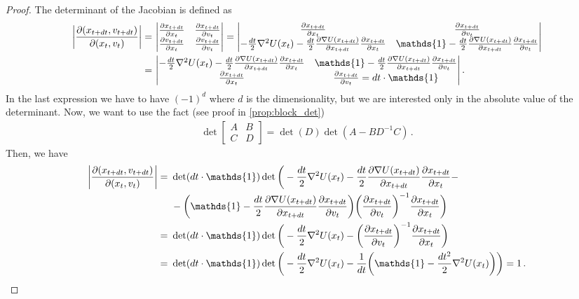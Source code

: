 \begin{proof}
The determinant of the Jacobian is defined as
    \begin{align}
        \bigg|\deriv{(x_{t+dt}, v_{t+dt})}{(x_{t}, v_{t})}\bigg| =~& 
        \begin{vmatrix}
            \deriv{x_{t+dt}}{x_{t}} & \deriv{x_{t+dt}}{v_{t}} \\
            \deriv{v_{t+dt}}{x_{t}} & \deriv{v_{t+dt}}{v_{t}} 
        \end{vmatrix}
        = \begin{vmatrix}
            \deriv{x_{t+dt}}{x_{t}} & \deriv{x_{t+dt}}{v_{t}} \\
            - \frac{dt}{2}\nabla^2U(x_t) - \frac{dt}{2}\deriv{\nabla U(x_{t+dt})}{x_{t+dt}}\deriv{x_{t+dt}}{x_t} & \mathds{1} - \frac{dt}{2}\deriv{\nabla U(x_{t+dt})}{x_{t+dt}}\deriv{x_{t+dt}}{v_t}
        \end{vmatrix}\\
        =~&
        \begin{vmatrix}
            - \frac{dt}{2}\nabla^2U(x_t) - \frac{dt}{2}\deriv{\nabla U(x_{t+dt})}{x_{t+dt}}\deriv{x_{t+dt}}{x_t} & \mathds{1} - \frac{dt}{2}\deriv{\nabla U(x_{t+dt})}{x_{t+dt}}\deriv{x_{t+dt}}{v_t}\\
            \deriv{x_{t+dt}}{x_{t}} & \deriv{x_{t+dt}}{v_{t}} = dt\cdot \mathds{1}
        \end{vmatrix}\,.
    \end{align}
In the last expression we have to have $(-1)^d$ where $d$ is the dimensionality, but we are interested only in the absolute value of the determinant. Now, we want to use the fact (see proof in \cref{prop:block_det})
    \begin{align}
        \det
        \begin{bmatrix}
            A & B\\
            C & D
        \end{bmatrix}
        = \det(D)\det(A-BD^{-1}C)\,.
    \end{align}
Then, we have
    \begin{align}
        \bigg|\deriv{(x_{t+dt}, v_{t+dt})}{(x_{t}, v_{t})}\bigg| =~& 
        \det(dt\cdot \mathds{1})\det\bigg(- \frac{dt}{2}\nabla^2U(x_t) - \frac{dt}{2}\deriv{\nabla U(x_{t+dt})}{x_{t+dt}}\deriv{x_{t+dt}}{x_t} - \\
        ~&-\left(\mathds{1} - \frac{dt}{2}\deriv{\nabla U(x_{t+dt})}{x_{t+dt}}\deriv{x_{t+dt}}{v_t}\right)\left(\deriv{x_{t+dt}}{v_{t}}\right)^{-1}\deriv{x_{t+dt}}{x_{t}}\bigg)\\
        =~& \det(dt\cdot \mathds{1})\det\bigg(- \frac{dt}{2}\nabla^2U(x_t) - \left(\deriv{x_{t+dt}}{v_{t}}\right)^{-1}\deriv{x_{t+dt}}{x_{t}}\bigg)\\
        =~& \det(dt\cdot \mathds{1})\det\bigg(- \frac{dt}{2}\nabla^2U(x_t) - \frac{1}{dt}\left(\mathds{1}-\frac{dt^2}{2}\nabla^2U(x_t)\right)\bigg) = 1\,.
    \end{align}
\end{proof}

